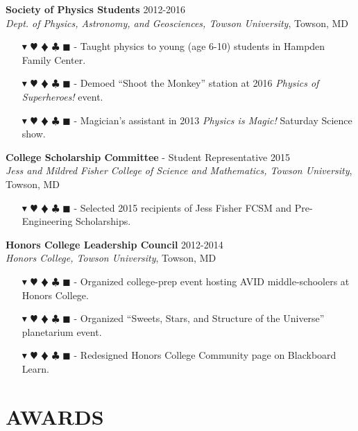 \documentclass[overlapped, 10pt]{res} %
\newcommand{\physics}{$\blacktriangledown$}
\newcommand{\biochem}{$\varheartsuit$}
\newcommand{\shannon}{$\vardiamondsuit$}
\newcommand{\classic}{$\clubsuit$}
\newcommand{\quantum}{$\blacksquare$}
\newcommand{\physicscolor}{\color{YellowOrange}}
\newcommand{\biochemcolor}{\color{Emerald}}
\newcommand{\shannoncolor}{\color{Goldenrod}}
\newcommand{\classiccolor}{\color{Cyan}}
\newcommand{\quantumcolor}{\color{RedOrange}}
\newcommand{\tag}[1]{
    {\IfSubStr{#1}{\physics}{\physicscolor}{\color{White}}\physics}
    {\IfSubStr{#1}{\biochem}{\biochemcolor}{\color{White}}\biochem}
    {\IfSubStr{#1}{\shannon}{\shannoncolor}{\color{White}}\shannon}
    {\IfSubStr{#1}{\classic}{\classiccolor}{\color{White}}\classic}
    {\IfSubStr{#1}{\quantum}{\quantumcolor}{\color{White}}\quantum}
}
\begin{document}
\begin{resume}
\textbf{Society of Physics Students} \hfill 2012-2016 \\
\textit{Dept. of Physics, Astronomy, and Geosciences, Towson University}, Towson, MD
\begin{itemize} \itemsep -2pt %
\item[\tag{\physics}-] Taught physics to young (age 6-10) students in Hampden Family Center.
\item[\tag{\physics}-] Demoed ``Shoot the Monkey'' station at 2016 \textit{Physics of Superheroes!} event.
\item[\tag{\physics}-] Magician's assistant in 2013 \textit{Physics is Magic!} Saturday Science show.
\end{itemize}

\textbf{College Scholarship Committee} - Student Representative \hfill 2015 \\
\textit{Jess and Mildred Fisher College of Science and Mathematics, Towson University}, Towson, MD
\begin{itemize} \itemsep -2pt %
\item[\tag{}-] Selected 2015 recipients of Jess Fisher FCSM and Pre-Engineering Scholarships.
\end{itemize}

\textbf{Honors College Leadership Council} \hfill 2012-2014 \\
\textit{Honors College, Towson University}, Towson, MD
\begin{itemize} \itemsep -2pt %
\item[\tag{}-] Organized college-prep event hosting AVID middle-schoolers at Honors College.
\item[\tag{}-] Organized ``Sweets, Stars, and Structure of the Universe'' planetarium event.
\item[\tag{}-] Redesigned Honors College Community page on Blackboard Learn.
\end{itemize}




\section{AWARDS}


\end{resume}
\end{document}
